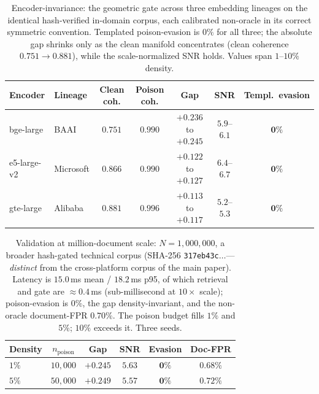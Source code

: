 \documentclass[10pt,journal,compsoc]{IEEEtran}
\begin{document}
\begin{table}[t]
\centering
\caption{Encoder-invariance: the geometric gate across three embedding lineages on the
identical hash-verified in-domain corpus, each calibrated non-oracle in its correct
symmetric convention. Templated poison-evasion is $0\%$ for all three; the absolute gap
shrinks only as the clean manifold concentrates (clean coherence $0.751\!\to\!0.881$),
while the scale-normalized SNR holds. Values span $1$--$10\%$ density.}
\label{tab:encoder}
\begin{tabular}{llccccc}
\toprule
Encoder & Lineage & Clean coh. & Poison coh. & Gap & SNR & Templ.\ evasion \\
\midrule
bge-large   & BAAI      & $0.751$ & $0.990$ & $+0.236$ to $+0.245$ & $5.9$--$6.1$ & $\mathbf{0\%}$ \\
e5-large-v2 & Microsoft & $0.866$ & $0.990$ & $+0.122$ to $+0.127$ & $6.4$--$6.7$ & $\mathbf{0\%}$ \\
gte-large   & Alibaba   & $0.881$ & $0.996$ & $+0.113$ to $+0.117$ & $5.2$--$5.3$ & $\mathbf{0\%}$ \\
\bottomrule
\end{tabular}
\end{table}

\begin{table}[t]
\centering
\caption{Validation at million-document scale: $N=1{,}000{,}000$, a broader hash-gated
technical corpus (SHA-256 \texttt{317eb43c}$\dots$---\emph{distinct} from the
cross-platform corpus of the main paper). Latency is $15.0$\,ms mean / $18.2$\,ms p95,
of which retrieval and gate are $\approx\!0.4$\,ms (sub-millisecond at $10\times$ scale);
poison-evasion is $0\%$, the gap density-invariant, and the non-oracle document-FPR
$0.70\%$. The poison budget fills $1\%$ and $5\%$; $10\%$ exceeds it. Three seeds.}
\label{tab:scale}
\begin{tabular}{lccccc}
\toprule
Density & $n_{\mathrm{poison}}$ & Gap & SNR & Evasion & Doc-FPR \\
\midrule
$1\%$ & $10{,}000$ & $+0.245$ & $5.63$ & $\mathbf{0\%}$ & $0.68\%$ \\
$5\%$ & $50{,}000$ & $+0.249$ & $5.57$ & $\mathbf{0\%}$ & $0.72\%$ \\
\bottomrule
\end{tabular}
\end{table}
\end{document}
